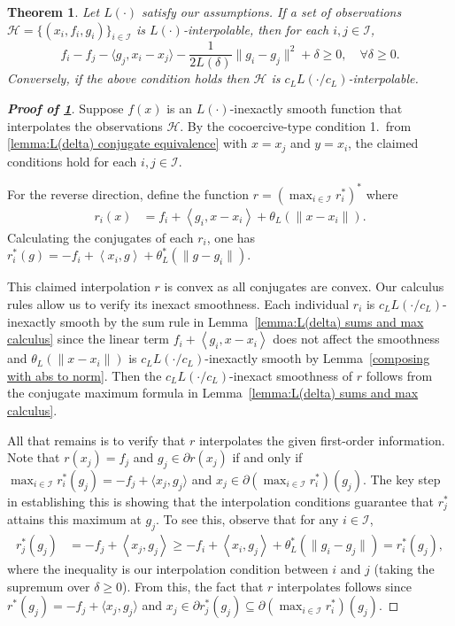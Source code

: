 \documentclass[10pt,a4paper]{amsart}
\newtheorem{theorem}{Theorem}
\newcommand{\Ical}{\mathcal{I}}
\newcommand{\inner}[2]{\left\langle {#1}, {#2} \right\rangle}
\begin{document}
\begin{theorem} \label{thm:interpolation-general}
   Let $L(\cdot)$ satisfy our assumptions. If a set of observations $\mathcal{H} =\{(x_i,f_i,g_i)\}_{i\in\Ical}$ is $L(\cdot)$-interpolable, then for each $i,j\in\Ical$,
\begin{equation}\label{eq:interpolation condition}
        f_i - f_j - \langle g_j, x_i-x_j\rangle - \frac{1}{2L(\delta)}\|g_i-g_j\|^2 + \delta \geq 0, \quad \forall \delta \geq 0 . 
    \end{equation} 
    Conversely, if the above condition holds then  $\mathcal{H}$ is ${c_L L(\cdot/c_L)}$-interpolable.
\end{theorem}

\begin{proof}[{\bf Proof of \cref{thm:interpolation-general}}]
Suppose $f(x)$ is an $L(\cdot)$-inexactly smooth function that interpolates the observations $\mathcal{H}$. By the cocoercive-type condition 1.~from \cref{lemma:L(delta) conjugate equivalence} with $x = x_j$ and $y = x_i$, the claimed conditions hold for each $i, j \in \Ical$. 

For the reverse direction, define the function $r = (\max_{i\in \Ical} r_i^*)^*$ where
\begin{align*}
     r_i(x) &= f_i + \inner{g_i}{x-x_i}+\theta_L(\|x-x_i\|).
 \end{align*} 
 Calculating the conjugates of each $r_i$, one has $r_i^*(g) = -f_i + \inner{x_i}{g}+\theta_L^*(\|g-g_i\|) $.
 
 This claimed interpolation $r$ is convex as all conjugates are convex. Our calculus rules allow us to verify its inexact smoothness. Each individual $r_i$ is $c_L L(\cdot/c_L)$-inexactly smooth by the sum rule in Lemma~\ref{lemma:L(delta) sums and max calculus} since the linear term $f_i + \inner{g_i}{x-x_i}$ does not affect the smoothness and $\theta_L(\|x-x_i\|)$ is $c_L L(\cdot/c_L)$-inexactly smooth by Lemma~\ref{composing with abs to norm}. Then the $c_L L(\cdot/c_L)$-inexact smoothness of $r$ follows from the conjugate maximum formula in Lemma~\ref{lemma:L(delta) sums and max calculus}.

 All that remains is to verify that $r$ interpolates the given first-order information. Note that $r(x_j) = f_j$ and $g_j\in\partial r(x_j)$ if and only if $\max_{i\in \Ical} r_i^*(g_j) = -f_j+\langle x_j,g_j\rangle$ and $x_j \in \partial (\max_{i\in \Ical} r_i^*)(g_j)$. The key step in establishing this is showing that the interpolation conditions guarantee that $r_j^*$ attains this maximum at $g_j$. To see this, observe that for any $i\in\Ical$,
 \begin{align*}
     r_j^*(g_j) &= -f_j + \inner{x_j}{g_j}
     \geq -f_i + \inner{x_i}{g_j}+\theta_L^*(\|g_i-g_j\|)
     =r_i^*(g_j),
 \end{align*}
 where the inequality is our interpolation condition between $i$ and $j$ (taking the supremum over $\delta \geq 0$).
 From this, the fact that $r$ interpolates follows since $r^*(g_j)=-f_j+\langle x_j,g_j\rangle$ and $x_j \in \partial r_j^*(g_j)\subseteq \partial (\max_{i\in \Ical} r_i^*)(g_j)$.
\end{proof}
\end{document}
